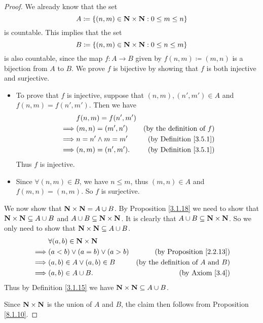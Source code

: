 \begin{proof}
    We already know that the set
    \[
        A \coloneqq \{(n, m) \in \mathbf{N} \times \mathbf{N} : 0 \leq m \leq n\}
    \]
    is countable.
    This implies that the set
    \[
        B \coloneqq \{(n, m) \in \mathbf{N} \times \mathbf{N} : 0 \leq n \leq m\}
    \]
    is also countable, since the map \(f : A \to B\) given by \(f(n, m) \coloneqq (m, n)\) is a bijection from \(A\) to \(B\).
    We prove \(f\) is bijective by showing that \(f\) is both injective and surjective.
    \begin{itemize}
        \item To prove that \(f\) is injective, suppose that \((n, m), (n', m') \in A\) and \(f(n, m) = f(n', m')\).
              Then we have
              \begin{align*}
                           & f(n, m) = f(n', m')                                       \\
                  \implies & (m, n) = (m', n')   & \text{(by the definition of \(f\))} \\
                  \implies & n = n' \land m = m' & \text{(by Definition \ref{3.5.1})}  \\
                  \implies & (n, m) = (n', m').  & \text{(by Definition \ref{3.5.1})}
              \end{align*}
              Thus \(f\) is injective.
        \item Since \(\forall (n, m) \in B\), we have \(n \leq m\), thus \((m, n) \in A\) and \(f(m, n) = (n, m)\).
              So \(f\) is surjective.
    \end{itemize}

    We now show that \(\mathbf{N} \times \mathbf{N} = A \cup B\).
    By Proposition \ref{3.1.18} we need to show that \(\mathbf{N} \times \mathbf{N} \subseteq A \cup B\) and \(A \cup B \subseteq \mathbf{N} \times \mathbf{N}\).
    It is clearly that \(A \cup B \subseteq \mathbf{N} \times \mathbf{N}\).
    So we only need to show that \(\mathbf{N} \times \mathbf{N} \subseteq A \cup B\).
    \begin{align*}
                 & \forall (a, b) \in \mathbf{N} \times \mathbf{N}                                                   \\
        \implies & (a < b) \lor (a = b) \lor (a > b) & \text{(by Proposition \ref{2.2.13})}          \\
        \implies & (a, b) \in A \lor (a, b) \in B    & \text{(by the definition of \(A\) and \(B\))} \\
        \implies & (a, b) \in A \cup B.              & \text{(by Axiom \ref{3.4})}
    \end{align*}
    Thus by Definition \ref{3.1.15} we have \(\mathbf{N} \times \mathbf{N} \subseteq A \cup B\).

    Since \(\mathbf{N} \times \mathbf{N}\) is the union of \(A\) and \(B\), the claim then follows from Proposition \ref{8.1.10}.
\end{proof}

